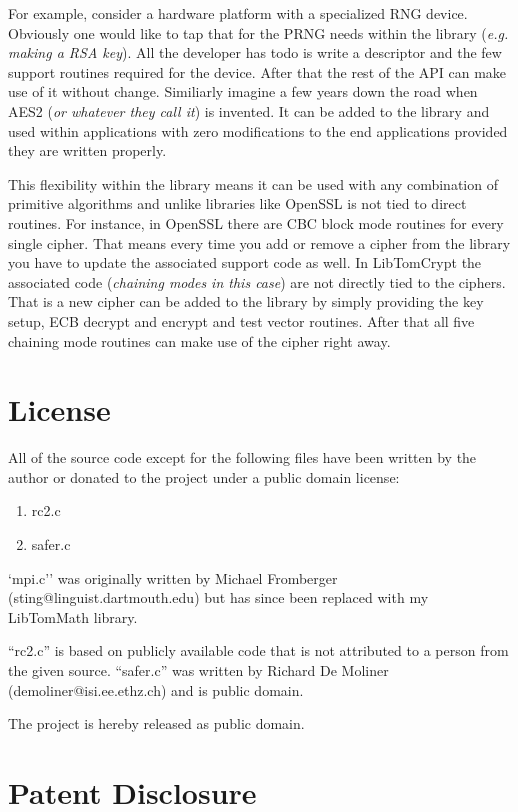 \documentclass[b5paper]{book}
\begin{document}
For example, consider a hardware platform with a specialized RNG device.  Obviously one would like to tap
that for the PRNG needs within the library (\textit{e.g. making a RSA key}).  All the developer has todo
is write a descriptor and the few support routines required for the device.  After that the rest of the 
API can make use of it without change.  Similiarly imagine a few years down the road when AES2 (\textit{or whatever they call it}) is
invented.  It can be added to the library and used within applications with zero modifications to the
end applications provided they are written properly.

This flexibility within the library means it can be used with any combination of primitive algorithms and 
unlike libraries like OpenSSL is not tied to direct routines.  For instance, in OpenSSL there are CBC block
mode routines for every single cipher.  That means every time you add or remove a cipher from the library
you have to update the associated support code as well.  In LibTomCrypt the associated code (\textit{chaining modes in this case})
are not directly tied to the ciphers.  That is a new cipher can be added to the library by simply providing 
the key setup, ECB decrypt and encrypt and test vector routines.  After that all five chaining mode routines
can make use of the cipher right away.


\section{License}

All of the source code except for the following files have been written by the author or donated to the project
under a public domain license:

\begin{enumerate}
   \item rc2.c
   \item safer.c
\end{enumerate}

`mpi.c'' was originally written by Michael Fromberger (sting@linguist.dartmouth.edu) but has since been replaced with my LibTomMath
library.

``rc2.c'' is based on publicly available code that is not attributed to a person from the given source.  ``safer.c''
was written by Richard De Moliner (demoliner@isi.ee.ethz.ch) and is public domain.

The project is hereby released as public domain.

\section{Patent Disclosure}
\end{document}
